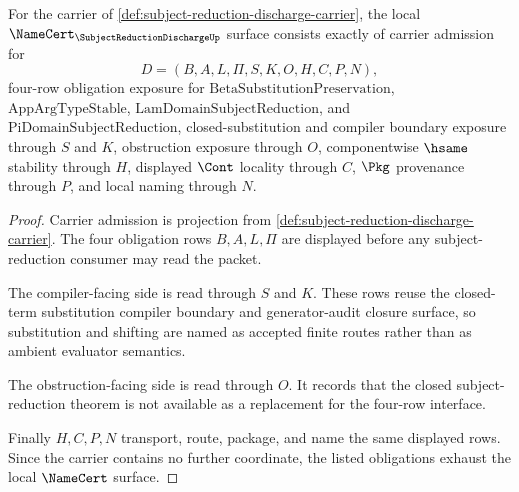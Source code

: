 
\begin{theorem}
\label{thm:subject-reduction-discharge-obligations}
For the carrier of \autoref{def:subject-reduction-discharge-carrier}, the local $\NameCert_{\SubjectReductionDischargeUp}$ surface consists exactly of carrier admission for
$$
D=(B,A,L,\Pi,S,K,O,H,C,P,N),
$$
four-row obligation exposure for $\mathrm{BetaSubstitutionPreservation}$, $\mathrm{AppArgTypeStable}$, $\mathrm{LamDomainSubjectReduction}$, and $\mathrm{PiDomainSubjectReduction}$, closed-substitution and compiler boundary exposure through $S$ and $K$, obstruction exposure through $O$, componentwise $\hsame$ stability through $H$, displayed $\Cont$ locality through $C$, $\Pkg$ provenance through $P$, and local naming through $N$.
\end{theorem}
\begin{proof}
Carrier admission is projection from \autoref{def:subject-reduction-discharge-carrier}. The four obligation rows $B,A,L,\Pi$ are displayed before any subject-reduction consumer may read the packet.

The compiler-facing side is read through $S$ and $K$. These rows reuse the closed-term substitution compiler boundary and generator-audit closure surface, so substitution and shifting are named as accepted finite routes rather than as ambient evaluator semantics.

The obstruction-facing side is read through $O$. It records that the closed subject-reduction theorem is not available as a replacement for the four-row interface.

Finally $H,C,P,N$ transport, route, package, and name the same displayed rows. Since the carrier contains no further coordinate, the listed obligations exhaust the local $\NameCert$ surface.
\end{proof}

